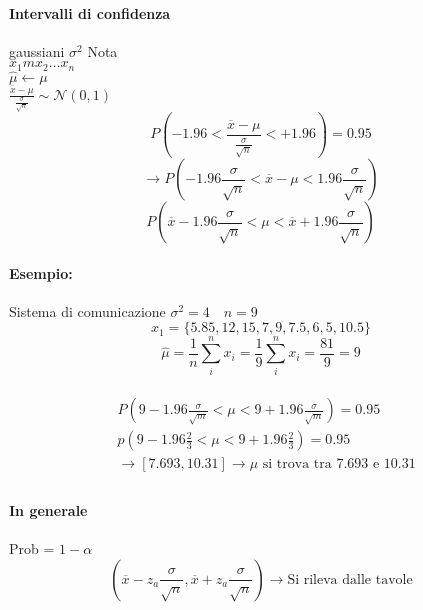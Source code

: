 \documentclass[]{article}
\begin{document}
    \paragraph{Intervalli di confidenza} gaussiani
    $\sigma^2$ Nota \\
    $x_1m x_2 \ldots x_n$ \\
    $\hat{\mu} \longleftarrow \mu$ \\
    $\frac{\overline{x} - \mu}{\frac{\sigma}{\sqrt{n}}} \sim \mathcal{N}(0,1)$ \\
    \[ P(-1.96 < \frac{\overline{x} - \mu}{\frac{\sigma}{\sqrt{n}}} < +1.96) = 0.95 \]
    \[ \longrightarrow P(-1.96 \frac{\sigma}{\sqrt{n}} < \overline{x} - \mu < 1.96 \frac{\sigma}{\sqrt{n}}) \]
    \[ P(\overline{x} - 1.96 \frac{\sigma}{\sqrt{n}} < \mu < \overline{x} + 1.96 \frac{\sigma}{\sqrt{n}}) \]
    \paragraph{Esempio:} Sistema di comunicazione
    $\sigma^2 = 4 \quad n = 9$
    \[ x_1 = \{ 5.85, 12, 15, 7, 9, 7.5, 6, 5, 10.5 \} \]
    \[ \hat{\mu} = \frac{1}{n} \sum_{i}^{n} x_i = \frac{1}{9} \sum_{i}^{n} x_i = \frac{81}{9} = 9 \] \\
    \begin{equation*}
        \begin{aligned}
            & P\left(9-1.96 \frac{\sigma}{\sqrt{m}}<\mu<9+1.96 \frac{\sigma}{\sqrt{m}}\right)=0.95 \\
            & p\left(9-1.96 \frac{2}{3}<\mu<9+1.96 \frac{2}{3}\right)=0.95 \\
            & \longrightarrow[7.693,10.31] \rightarrow \mu \text { si trova tra 7.693 e 10.31} \\
        \end{aligned}
    \end{equation*}
    \paragraph{In generale} Prob = $1-\alpha$
    \[ (\overline{x} - z_a \frac{\sigma}{\sqrt{n}}, \overline{x} + z_a \frac{\sigma}{\sqrt{n}} ) \rightarrow \text{Si rileva dalle tavole} \]
\end{document}
